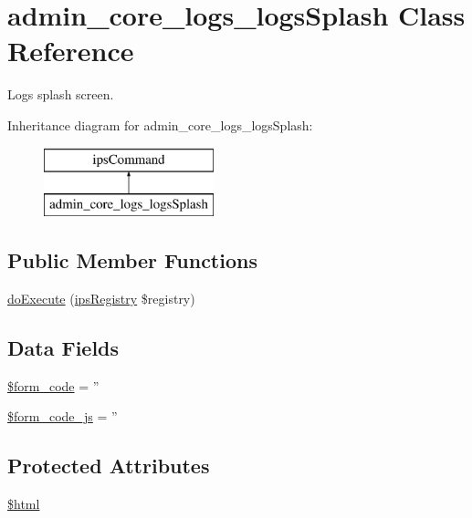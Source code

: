 \hypertarget{classadmin__core__logs__logs_splash}{\section{admin\-\_\-core\-\_\-logs\-\_\-logs\-Splash Class Reference}
\label{classadmin__core__logs__logs_splash}
}


Logs splash screen.  


Inheritance diagram for admin\-\_\-core\-\_\-logs\-\_\-logs\-Splash\-:\begin{figure}[H]
\begin{center}
\leavevmode
\includegraphics[height=2.000000cm]{classadmin__core__logs__logs_splash}
\end{center}
\end{figure}
\subsection*{Public Member Functions}
\begin{DoxyCompactItemize}
\item 
\hyperlink{classadmin__core__logs__logs_splash_afbc4e912a0604b94d47d66744c64d8ba}{do\-Execute} (\hyperlink{classips_registry}{ips\-Registry} \$registry)
\end{DoxyCompactItemize}
\subsection*{Data Fields}
\begin{DoxyCompactItemize}
\item 
\hyperlink{classadmin__core__logs__logs_splash_af28aee726fa3eb6c355d08a2ab655e03}{\$form\-\_\-code} = ''
\item 
\hyperlink{classadmin__core__logs__logs_splash_ac68fe8a02a2efd63c3271179f4b4fbb7}{\$form\-\_\-code\-\_\-js} = ''
\end{DoxyCompactItemize}
\subsection*{Protected Attributes}
\begin{DoxyCompactItemize}
\item 
\hyperlink{classadmin__core__logs__logs_splash_a6f96e7fc92441776c9d1cd3386663b40}{\$html}
\end{DoxyCompactItemize}



